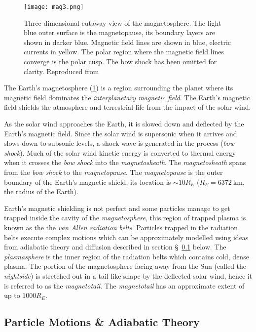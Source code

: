 \begin{figure}[ht]
    \noindent\texttt{[image: mag3.png]}
    \caption{
        {\small 
            Three-dimensional cutaway view of the magnetosphere. The light blue outer surface is 
            the magnetopause, its boundary layers are shown in darker blue. Magnetic field lines 
            are shown in blue, electric currents in yellow. The polar region where the magnetic 
            field lines converge is the polar cusp. The bow shock has been omitted for clarity. 
            Reproduced from \citet{DeKeyser2005}
        }
    }
    \label{fig:magnetosphere}
\end{figure}

The Earth's magnetosphere (\cref{fig:magnetosphere}) is a region surrounding the planet where its 
magnetic field dominates the \emph{interplanetary magnetic field}. The Earth's magnetic field 
shields the atmosphere and terrestrial life from the impact of the solar wind. 

As the solar wind approaches the Earth, it is slowed down and deflected by the Earth's magnetic 
field. Since the solar wind is supersonic when it arrives and slows down to subsonic levels, a 
shock wave is generated in the process (\emph{bow shock}). Much of the solar wind kinetic energy is 
converted to thermal energy when it crosses the \emph{bow shock} into the \emph{magnetosheath}. The 
\emph{magnetosheath} spans from the \emph{bow shock} to the \emph{magnetopause}. The 
\emph{magnetopause} is the outer boundary of the Earth's magnetic shield, its location is 
$\sim 10R_E$ ($R_E = \SI{6372}{\kilo\metre}$, the radius of the Earth). 


Earth's magnetic shielding is not perfect and some particles manage to get trapped inside the 
cavity of the \emph{magnetosphere}, this region of trapped plasma is known as the the 
\emph{van Allen radiation belts}. Particles trapped in the radiation belts execute complex motions 
which can be approximately modelled using ideas from adiabatic theory and diffusion described in 
section \S~\ref{sec:plasmadiff} below. The \emph{plasmasphere} is the inner region of the radiation 
belts which contains cold, dense plasma. The portion of the magnetosphere facing away from the Sun 
(called the \emph{nightside}) is stretched out in a tail like shape by the deflected solar wind, 
hence it is referred to as the \emph{magnetotail}. The \emph{magnetotail} has an approximate extent 
of up to $1000R_E$.


\subsection{Particle Motions \& Adiabatic Theory} \label{sec:plasmadiff}

